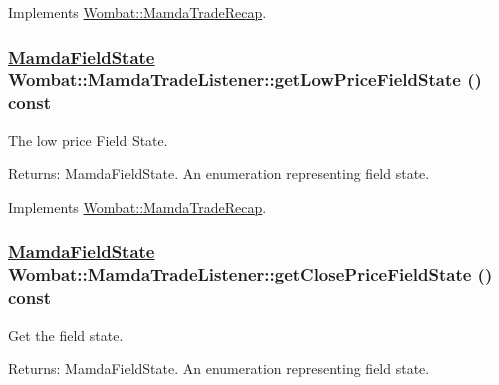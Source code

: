 Implements \hyperlink{classWombat_1_1MamdaTradeRecap_a96180881510aca5fb838905052fffa5}{Wombat::Mamda\-Trade\-Recap}.\hypertarget{classWombat_1_1MamdaTradeListener_5830510164c197655c2b9848a06a3e0a}{
\subsubsection[getLowPriceFieldState]{\setlength{\rightskip}{0pt plus 5cm}\hyperlink{namespaceWombat_93aac974f2ab713554fd12a1fa3b7d2a}{Mamda\-Field\-State} Wombat::Mamda\-Trade\-Listener::get\-Low\-Price\-Field\-State () const}}
\label{classWombat_1_1MamdaTradeListener_5830510164c197655c2b9848a06a3e0a}


The low price Field State. 

\begin{Desc}
\item[Returns:]Mamda\-Field\-State. An enumeration representing field state. \end{Desc}


Implements \hyperlink{classWombat_1_1MamdaTradeRecap_db9836665c7f6b15c26f379ab680c374}{Wombat::Mamda\-Trade\-Recap}.\hypertarget{classWombat_1_1MamdaTradeListener_47222f2a6f39a3fcca3128317718cc79}{
\subsubsection[getClosePriceFieldState]{\setlength{\rightskip}{0pt plus 5cm}\hyperlink{namespaceWombat_93aac974f2ab713554fd12a1fa3b7d2a}{Mamda\-Field\-State} Wombat::Mamda\-Trade\-Listener::get\-Close\-Price\-Field\-State () const}}
\label{classWombat_1_1MamdaTradeListener_47222f2a6f39a3fcca3128317718cc79}


Get the field state. 

\begin{Desc}
\item[Returns:]Mamda\-Field\-State. An enumeration representing field state. \end{Desc}


